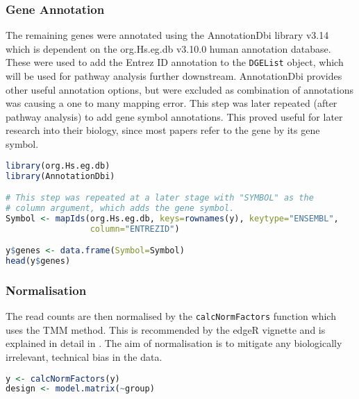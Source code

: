 \subsubsection{Gene Annotation}

The remaining genes were annotated using the AnnotationDbi library v3.14 \citep{annotationdbi} which is dependent on the org.Hs.eg.db v3.10.0 \citep{org.Hs.eg.db} human annotation database. These were used to add the Entrez ID annotation to the \texttt{DGEList} object, which will be used for pathway analysis further downstream. AnnotationDbi provides other useful annotation options, but were excluded as combination of annotations was causing a one to many mapping error. This step was later repeated (after pathway analysis) to add gene symbol annotations. This proved useful for later research into their biology, since most papers refer to the gene by its gene symbol.

\begin{lstlisting}[language=R, caption=Annotation step]
library(org.Hs.eg.db)
library(AnnotationDbi) 

# This step was repeated at a later stage with "SYMBOL" as the
# column argument, which adds the gene symbol.
Symbol <- mapIds(org.Hs.eg.db, keys=rownames(y), keytype="ENSEMBL",
                 column="ENTREZID")

y$genes <- data.frame(Symbol=Symbol)
head(y$genes)
\end{lstlisting}

\subsubsection{Normalisation}

The read counts are then normalised by the \texttt{calcNormFactors} function which uses the \ac{TMM} method. This is recommended by the edgeR vignette and is explained in detail in \cite{robinson2010scaling}. The aim of normalisation is to mitigate any biologically irrelevant, technical bias in the data.

\begin{lstlisting}[language=R, caption=TMM normalisation]
y <- calcNormFactors(y)
design <- model.matrix(~group)
\end{lstlisting}



